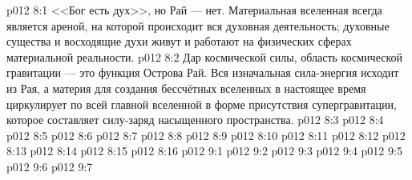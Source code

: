 \vs p012 8:1 <<Бог есть дух>>, но Рай --- нет. Материальная вселенная всегда является ареной, на которой происходит вся духовная деятельность; духовные существа и восходящие духи живут и работают на физических сферах материальной реальности.
\vs p012 8:2 \pc Дар космической силы, область космической гравитации --- это функция Острова Рай. Вся изначальная сила\hyp{}энергия исходит из Рая, а материя для создания бессчётных вселенных в настоящее время циркулирует по всей главной вселенной в форме присутствия супергравитации, которое составляет силу\hyp{}заряд насыщенного пространства.
\vs p012 8:3 
\vs p012 8:4 \pc 
\vs p012 8:5 
\vs p012 8:6 \pc 
\vs p012 8:7 
\vs p012 8:8 
\vs p012 8:9 \pc 
\vs p012 8:10 
\vs p012 8:11 
\vs p012 8:12 
\vs p012 8:13 \pc 
\vs p012 8:14 \pc 
\vs p012 8:15 
\vs p012 8:16 
\vs p012 9:1 
\vs p012 9:2 \pc 
\vs p012 9:3 
\vs p012 9:4 
\vs p012 9:5 
\vs p012 9:6 \pc 
\vsetoff
\vs p012 9:7 
\quizlink
